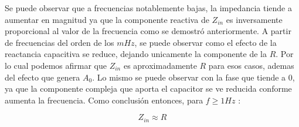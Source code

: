 Se puede observar que a frecuencias notablemente bajas, la impedancia tiende a aumentar en magnitud ya que la componente reactiva de 
$Z_{in}$ es inversamente proporcional al valor de la frecuencia como se demostró anteriormente.
A partir de frecuencias del orden de los $mHz$, se puede observar como el efecto de la reactancia capacitiva 
se reduce, dejando unicamente la componente de la $R$. Por lo cual podemos afirmar que $Z_{in}$ es aproximadamente $R$ para esos casos, ademas del efecto que genera $A_0$.
Lo mismo se puede observar con la fase que tiende a 0, ya que la componente compleja que aporta el capacitor se ve reducida conforme aumenta la frecuencia.
Como conclusión entonces, para $f \geq 1Hz$ :

$$Z_{in} \approx R$$
